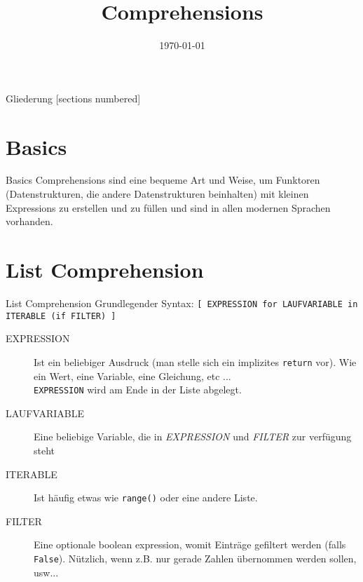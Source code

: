 



\title{Comprehensions}
\date{\today}




\maketitle

\begin{frame}{Gliederung}
	[sections numbered]
	\tableofcontents
\end{frame}


\section{Basics}
\begin{frame}{Basics}
  Comprehensions sind eine bequeme Art und Weise, um Funktoren (Datenstrukturen, die andere Datenstrukturen beinhalten) mit kleinen Expressions zu erstellen und zu füllen und sind in allen modernen Sprachen vorhanden.
\end{frame}



\section{List Comprehension}
\begin{frame}{List Comprehension}
  Grundlegender Syntax: \alert{\texttt{[ EXPRESSION for LAUFVARIABLE in ITERABLE (if FILTER) ]}}\\
  \begin{description}
    \item[EXPRESSION] Ist ein beliebiger Ausdruck (man stelle sich ein implizites \texttt{return} vor). Wie ein Wert, eine Variable, eine Gleichung, etc ... \\
    	\texttt{EXPRESSION} wird am Ende in der Liste abgelegt.
    \item[LAUFVARIABLE] Eine beliebige Variable, die in \textit{EXPRESSION} und \textit{FILTER} zur verfügung steht
    \item[ITERABLE] Ist häufig etwas wie \texttt{range()} oder eine andere Liste.
    \item[FILTER] Eine optionale boolean expression, womit Einträge gefiltert werden (falls \texttt{False}). N\"utzlich, wenn z.B. nur gerade Zahlen \"ubernommen werden sollen, usw...
  \end{description}

\end{frame}

